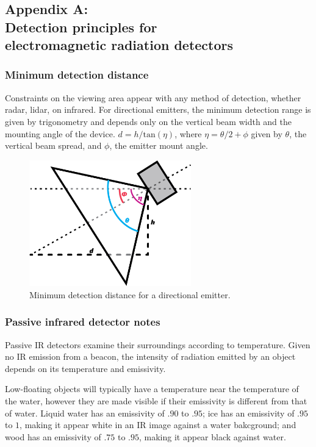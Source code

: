 \subsection*{Appendix A:\\Detection principles for\\electromagnetic radiation detectors} \label{app:AppendixA}
\subsubsection*{\label{sec:app:min-distance}Minimum detection distance}
Constraints on the viewing area appear with any method of detection, whether radar, lidar, on infrared. For directional emitters, the minimum detection range is given by trigonometry and depends only on the vertical beam width and the mounting angle of the device. $d = h/\text{tan}(\eta)$, where $\eta=\theta/2+\phi$ given by $\theta$, the vertical beam spread, and $\phi$, the emitter mount angle.
\begin{figure}
\includegraphics[width=70mm,natwidth=505,natheight=394]{"./image/directional-emitters"}
\caption{\label{fig:emitter-angle}Minimum detection distance for a directional emitter.}
\end{figure}

\subsubsection*{\label{sec:app:infrared-image}Passive infrared detector notes}
Passive IR detectors examine their surroundings according to temperature. Given no IR emission from a beacon, the intensity of radiation emitted by an object depends on its temperature and emissivity.

Low-floating objects will typically have a temperature near the temperature of the water, however they are made visible if their emissivity is different from that of water. Liquid water has an emissivity of $.90$ to $.95$; ice has an emissivity of $.95$ to $1$, making it appear white in an IR image against a water bakcground; and wood has an emissivity of $.75$ to $.95$, making it appear black against water. \cite{optotherm-emisstable}
